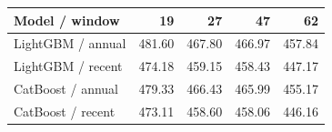 \begin{tabular}{lrrrr}
\toprule
Model / window & 19 & 27 & 47 & 62 \\
\midrule
LightGBM / annual & 481.60 & 467.80 & 466.97 & 457.84 \\
LightGBM / recent & 474.18 & 459.15 & 458.43 & 447.17 \\
CatBoost / annual & 479.33 & 466.43 & 465.99 & 455.17 \\
CatBoost / recent & 473.11 & 458.60 & 458.06 & 446.16 \\
\bottomrule
\end{tabular}
